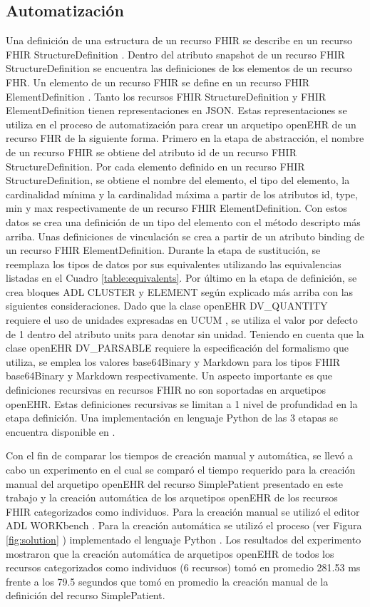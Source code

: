 \subsection{Automatización}

Una definición de una estructura de un recurso FHIR se describe en un recurso FHIR StructureDefinition \cite{FHIRStructureDefinition}. Dentro del atributo snapshot de un recurso FHIR StructureDefinition se encuentra las definiciones de los elementos de un recurso FHR. Un elemento de un recurso FHIR se define en un recurso FHIR ElementDefinition \cite{FHIRElementDefinition}. Tanto los recursos FHIR StructureDefinition y FHIR ElementDefinition tienen representaciones en JSON. Estas representaciones se utiliza en el proceso de automatización para crear un arquetipo openEHR de un recurso FHR de la siguiente forma. Primero en la etapa de abstracción, el nombre de un recurso FHIR se obtiene del atributo id de un recurso FHIR StructureDefinition. Por cada elemento definido en un recurso FHIR StructureDefinition, se obtiene el nombre del elemento, el tipo del elemento, la cardinalidad mínima y la cardinalidad máxima a partir de los atributos id, type, min y max respectivamente de un recurso FHIR ElementDefinition. Con estos datos se crea una definición de un tipo del elemento con el método descripto más arriba. Unas definiciones de vinculación se crea a partir de un atributo binding de un recurso FHIR ElementDefinition. Durante la etapa de sustitución, se reemplaza los tipos de datos por sus equivalentes utilizando las equivalencias listadas en el Cuadro \ref{table:equivalents}. Por último en la etapa de definición, se crea bloques ADL CLUSTER y ELEMENT según explicado más arriba con las siguientes consideraciones. Dado que la clase openEHR DV\_QUANTITY requiere el uso de unidades expresadas en UCUM \cite{UCUM}, se utiliza el valor por defecto de 1 dentro del atributo units para denotar sin unidad. Teniendo en cuenta que la clase openEHR DV\_PARSABLE requiere la especificación del formalismo que utiliza, se emplea los valores base64Binary y Markdown para los tipos FHIR base64Binary y Markdown respectivamente. Un aspecto importante es que definiciones recursivas en recursos FHIR no son soportadas en arquetipos openEHR. Estas definiciones recursivas se limitan a 1 nivel de profundidad en la etapa definición. Una implementación en lenguaje Python de las 3 etapas se encuentra disponible en \cite{PythonImplementation}.

Con el fin de comparar los tiempos de creación manual y automática, se llevó a cabo un experimento en el cual se comparó el tiempo requerido para la creación manual del arquetipo openEHR del recurso SimplePatient presentado en este trabajo  y la creación automática de los arquetipos openEHR de los recursos FHIR categorizados como individuos. Para la creación manual se utilizó el editor ADL WORKbench \cite{ADLWORKbench}. Para la creación automática se utilizó el proceso (ver Figura \ref{fig:solution} ) implementado el lenguaje Python \cite{PythonImplementation}. Los resultados del experimento mostraron que la creación automática de arquetipos openEHR de todos los recursos categorizados como individuos (6 recursos) tomó en promedio 281.53 ms frente a los 79.5 segundos que tomó en promedio la creación manual de la definición del recurso SimplePatient.
